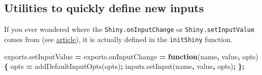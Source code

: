 \documentclass[]{book}
\newenvironment{Shaded}{\begin{snugshade}}{\end{snugshade}}
\newcommand{\AttributeTok}[1]{\textcolor[rgb]{0.77,0.63,0.00}{#1}}
\newcommand{\ControlFlowTok}[1]{\textcolor[rgb]{0.13,0.29,0.53}{\textbf{#1}}}
\newcommand{\DecValTok}[1]{\textcolor[rgb]{0.00,0.00,0.81}{#1}}
\newcommand{\KeywordTok}[1]{\textcolor[rgb]{0.13,0.29,0.53}{\textbf{#1}}}
\newcommand{\NormalTok}[1]{#1}
\newcommand{\OperatorTok}[1]{\textcolor[rgb]{0.81,0.36,0.00}{\textbf{#1}}}
\newcommand{\StringTok}[1]{\textcolor[rgb]{0.31,0.60,0.02}{#1}}
\newcommand{\VariableTok}[1]{\textcolor[rgb]{0.00,0.00,0.00}{#1}}
\begin{document}
\begin{Shaded}
\end{Shaded}

\hypertarget{utilities-to-quickly-define-new-inputs}{%
\subsection{Utilities to quickly define new inputs}\label{utilities-to-quickly-define-new-inputs}}

If you ever wondered where the \texttt{Shiny.onInputChange} or \texttt{Shiny.setInputValue} comes from (see \href{https://shiny.rstudio.com/articles/communicating-with-js.html}{article}), it is actually defined in the \texttt{initShiny} function.

\begin{Shaded}
\begin{Highlighting}[]
\VariableTok{exports}\NormalTok{.}\AttributeTok{setInputValue} \OperatorTok{=} \VariableTok{exports}\NormalTok{.}\AttributeTok{onInputChange} \OperatorTok{=} \KeywordTok{function}\NormalTok{(name}\OperatorTok{,}\NormalTok{ value}\OperatorTok{,}\NormalTok{ opts) }\OperatorTok{\{}
\NormalTok{  opts }\OperatorTok{=} \AttributeTok{addDefaultInputOpts}\NormalTok{(opts)}\OperatorTok{;}
  \VariableTok{inputs}\NormalTok{.}\AttributeTok{setInput}\NormalTok{(name}\OperatorTok{,}\NormalTok{ value}\OperatorTok{,}\NormalTok{ opts)}\OperatorTok{;}
\OperatorTok{\};}
\end{Highlighting}
\end{Shaded}
\end{document}
